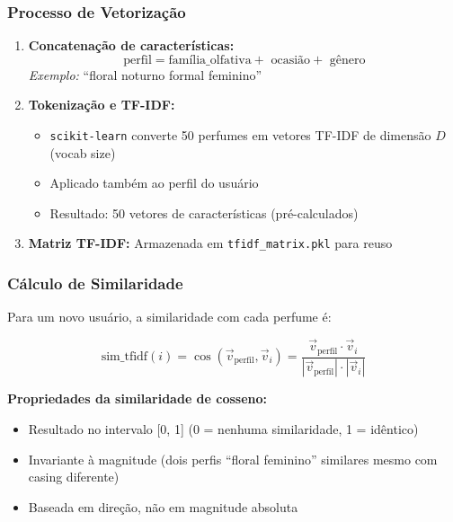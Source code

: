 \documentclass[12pt,a4paper]{article}
\begin{document}
\subsubsection{Processo de Vetorização}

\begin{enumerate}
    \item \textbf{Concatenação de características:}
    \begin{equation}
    \text{perfil} = \text{família\_olfativa} + \text{ ocasião} + \text{ gênero}
    \end{equation}
    \textit{Exemplo:} ``floral noturno formal feminino''
    
    \item \textbf{Tokenização e TF-IDF:}
    \begin{itemize}
        \item \texttt{scikit-learn} converte 50 perfumes em vetores TF-IDF de dimensão $D$ (vocab size)
        \item Aplicado também ao perfil do usuário
        \item Resultado: 50 vetores de características (pré-calculados)
    \end{itemize}
    
    \item \textbf{Matriz TF-IDF:} Armazenada em \texttt{tfidf\_matrix.pkl} para reuso
\end{enumerate}

\subsubsection{Cálculo de Similaridade}

Para um novo usuário, a similaridade com cada perfume é:

\begin{equation}
\text{sim\_tfidf}(i) = \cos(\vec{v}_{\text{perfil}}, \vec{v}_{i}) = \frac{\vec{v}_{\text{perfil}} \cdot \vec{v}_{i}}{|\vec{v}_{\text{perfil}}| \cdot |\vec{v}_{i}|}
\end{equation}

\textbf{Propriedades da similaridade de cosseno:}
\begin{itemize}
    \item Resultado no intervalo [0, 1] (0 = nenhuma similaridade, 1 = idêntico)
    \item Invariante à magnitude (dois perfis ``floral feminino'' similares mesmo com casing diferente)
    \item Baseada em direção, não em magnitude absoluta
\end{itemize}
\end{document}
